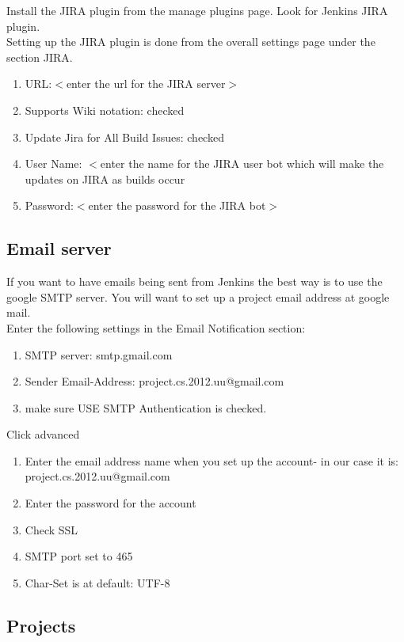 Install the JIRA plugin from the manage plugins page. Look for Jenkins JIRA plugin.\\
Setting up the JIRA plugin is done from the overall settings page under the section JIRA.\\
\begin{enumerate}
\item URL:$<$enter the url for the JIRA server$>$
\item Supports Wiki notation: checked
\item Update Jira for All Build Issues: checked
\item User Name: $<$enter the name for the JIRA user bot which will make the updates on JIRA as builds occur
\item Password:$<$enter the password for the JIRA bot$>$
\end{enumerate}


\subsection{Email server}

If you want to have emails being sent from Jenkins the best way is to use the google SMTP server. You will want to set up a project email address at google mail.\\

Enter the following settings in the Email Notification section:
\begin{enumerate}
\item SMTP server: smtp.gmail.com
\item Sender Email-Address: project.cs.2012.uu@gmail.com
\item make sure USE SMTP Authentication is checked.
\end{enumerate}

Click advanced 
\begin{enumerate}
\item Enter the email address name when you set up the account- in our case it is: project.cs.2012.uu@gmail.com
\item Enter the password for the account
\item Check SSL
\item SMTP port set to 465
\item Char-Set is at default: UTF-8
\end{enumerate}

\subsection{Projects}

